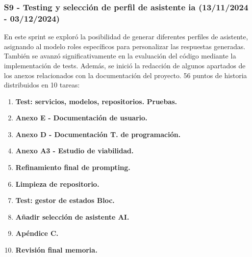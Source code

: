 \subsubsection{S9 - Testing y selección de perfil de asistente \acrshort{ia} (13/11/2024 - 03/12/2024)}
En este sprint se exploró la posibilidad de generar diferentes perfiles de asistente, asignando al modelo roles específicos para personalizar las respuestas generadas. También se avanzó significativamente en la evaluación del código mediante la implementación de tests. Además, se inició la redacción de algunos apartados de los anexos relacionados con la documentación del proyecto. 56 puntos de historia distribuidos en 10 tareas:
\begin{enumerate}
	\item \textbf{Test: servicios, modelos, repositorios. Pruebas.}
	\item \textbf{Anexo E - Documentación de usuario.}
	\item \textbf{Anexo D - Documentación T. de programación.}
	\item \textbf{Anexo A3 - Estudio de viabilidad.}
	\item \textbf{Refinamiento final de prompting.}
	\item \textbf{Limpieza de repositorio.}
	\item \textbf{Test: gestor de estados Bloc.}
	\item \textbf{Añadir selección de asistente AI.}
	\item \textbf{Apéndice C.}
	\item \textbf{Revisión final memoria.}
\end{enumerate}

